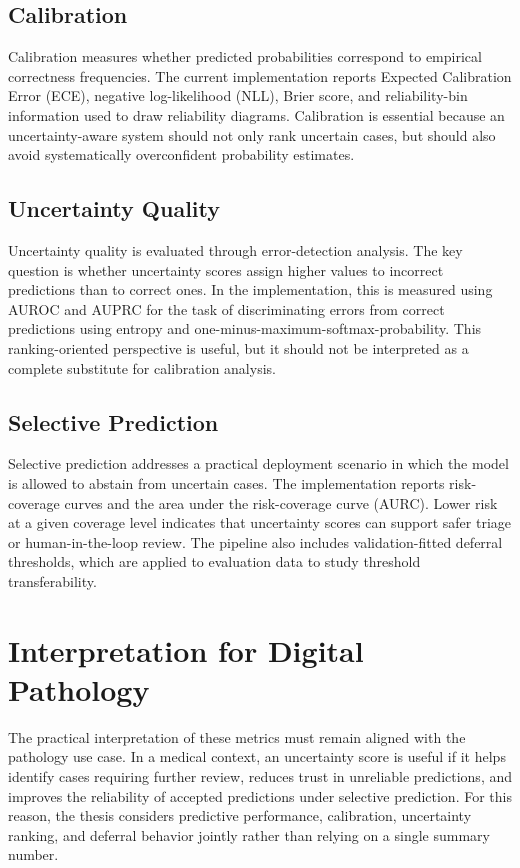 \subsection{Calibration}

Calibration measures whether predicted probabilities correspond to empirical correctness frequencies. The current implementation reports Expected Calibration Error (ECE), negative log-likelihood (NLL), Brier score, and reliability-bin information used to draw reliability diagrams. Calibration is essential because an uncertainty-aware system should not only rank uncertain cases, but should also avoid systematically overconfident probability estimates.

\subsection{Uncertainty Quality}

Uncertainty quality is evaluated through error-detection analysis. The key question is whether uncertainty scores assign higher values to incorrect predictions than to correct ones. In the implementation, this is measured using AUROC and AUPRC for the task of discriminating errors from correct predictions using entropy and one-minus-maximum-softmax-probability. This ranking-oriented perspective is useful, but it should not be interpreted as a complete substitute for calibration analysis.

\subsection{Selective Prediction}

Selective prediction addresses a practical deployment scenario in which the model is allowed to abstain from uncertain cases. The implementation reports risk-coverage curves and the area under the risk-coverage curve (AURC). Lower risk at a given coverage level indicates that uncertainty scores can support safer triage or human-in-the-loop review. The pipeline also includes validation-fitted deferral thresholds, which are applied to evaluation data to study threshold transferability.

\section{Interpretation for Digital Pathology}

The practical interpretation of these metrics must remain aligned with the pathology use case. In a medical context, an uncertainty score is useful if it helps identify cases requiring further review, reduces trust in unreliable predictions, and improves the reliability of accepted predictions under selective prediction. For this reason, the thesis considers predictive performance, calibration, uncertainty ranking, and deferral behavior jointly rather than relying on a single summary number.

